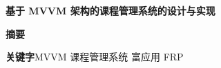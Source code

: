 \newpage
\begin{center}
	\heiti{}\textbf{基于 MVVM 架构的课程管理系统的设计与实现}
\end{center}
\begin{center}
	\heiti{}\textbf{摘\quad 要}
\end{center}
\vspace{2.5mm}
\songti{}

\vspace{3mm}
\heiti\textbf{关键字}\quad \songti MVVM \quad 课程管理系统 \quad 富应用 \quad FRP

